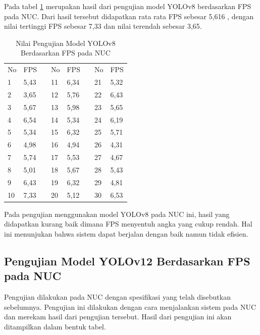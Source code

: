 Pada tabel \ref{tb:TabelYolov8NUC} merupakan hasil dari pengujian model YOLOv8 berdasarkan FPS pada NUC. Dari hasil tersebut didapatkan rata rata FPS sebesar 5,616 , dengan nilai tertinggi FPS sebesar 7,33 dan nilai terendah sebesar 3,65.

\begin{table}[H]
  \caption{Nilai Pengujian Model YOLOv8 Berdasarkan FPS pada NUC} 
  \label{tb:TabelYolov8NUC}
  \centering
  \begin{tabular}{|l|l|l|l|l|l|l|l|}
  \cline{1-2} \cline{4-5} \cline{7-8}
  No & FPS  &  & No & FPS  &  & No & FPS  \\ \cline{1-2} \cline{4-5} \cline{7-8} 
  1  & 5,43 &  & 11 & 6,34 &  & 21 & 5,32 \\ \cline{1-2} \cline{4-5} \cline{7-8} 
  2  & 3,65 &  & 12 & 5,76 &  & 22 & 6,43 \\ \cline{1-2} \cline{4-5} \cline{7-8} 
  3  & 5,67 &  & 13 & 5,98 &  & 23 & 5,65 \\ \cline{1-2} \cline{4-5} \cline{7-8} 
  4  & 6,54 &  & 14 & 5,34 &  & 24 & 6,19 \\ \cline{1-2} \cline{4-5} \cline{7-8} 
  5  & 5,34 &  & 15 & 6,32 &  & 25 & 5,71 \\ \cline{1-2} \cline{4-5} \cline{7-8} 
  6  & 4,98 &  & 16 & 4,94 &  & 26 & 4,31 \\ \cline{1-2} \cline{4-5} \cline{7-8} 
  7  & 5,74 &  & 17 & 5,53 &  & 27 & 4,67 \\ \cline{1-2} \cline{4-5} \cline{7-8} 
  8  & 5,01 &  & 18 & 5,67 &  & 28 & 5,43 \\ \cline{1-2} \cline{4-5} \cline{7-8} 
  9  & 6,43 &  & 19 & 6,32 &  & 29 & 4,81 \\ \cline{1-2} \cline{4-5} \cline{7-8} 
  10 & 7,33 &  & 20 & 5,12 &  & 30 & 6,53 \\ \cline{1-2} \cline{4-5} \cline{7-8} 
  \end{tabular}
\end{table}

Pada pengujian menggunakan model YOLOv8 pada NUC ini, hasil yang didapatkan kurang baik dimana FPS menyentuh angka yang cukup rendah. Hal ini menunjukan bahwa sistem dapat berjalan dengan baik namun tidak efisien.

\subsection{Pengujian Model YOLOv12 Berdasarkan FPS pada NUC}

Pengujian dilakukan pada NUC dengan spesifikasi yang telah disebutkan sebelumnya. Pengujian ini dilakukan dengan cara menjalankan sistem pada NUC dan merekam hasil dari pengujian tersebut. Hasil dari pengujian ini akan ditampilkan dalam bentuk tabel. 

